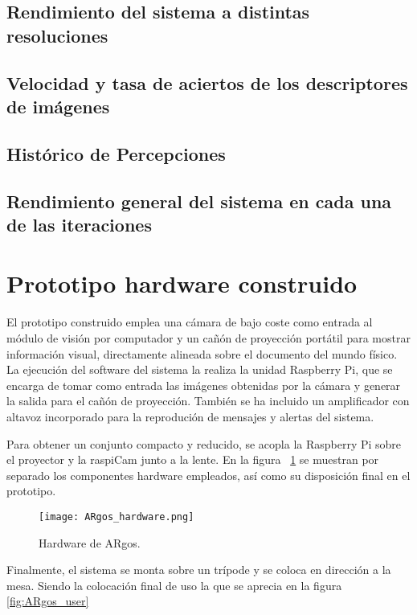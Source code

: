\subsection{Rendimiento del sistema a distintas resoluciones}
\subsection{Velocidad y tasa de aciertos de los descriptores de imágenes}
\subsection{Histórico de Percepciones}
\subsection{Rendimiento general del sistema en cada una de las iteraciones}



\section{Prototipo hardware construido}
El prototipo construido emplea una cámara de bajo coste como entrada al módulo de visión por computador y un cañón de proyección portátil para mostrar información visual, directamente alineada sobre el documento del mundo físico. La ejecución del software del sistema la realiza la unidad Raspberry Pi, que se encarga de tomar como entrada las imágenes obtenidas por la cámara y generar la salida para el cañón de proyección. También se ha incluido un amplificador con altavoz incorporado para la reprodución de mensajes y alertas del sistema.

Para obtener un conjunto compacto y reducido, se acopla la Raspberry Pi sobre el proyector y la raspiCam junto a la lente. En la figura ~\ref{fig:ARgos_hardware} se muestran por separado los componentes hardware empleados, así como su disposición final en el prototipo.

\begin{figure}
  \begin{center}
    \texttt{[image: ARgos\_hardware.png]}
    \caption{Hardware de ARgos.}
    \label{fig:ARgos_hardware}
  \end{center}
\end{figure}

Finalmente, el sistema se monta sobre un trípode y se coloca en dirección a la mesa. Siendo la colocación final de uso la que se aprecia en la figura \ref{fig:ARgos_user} 

